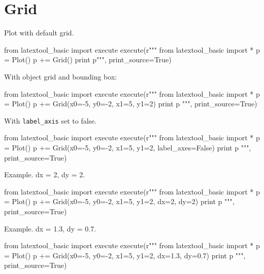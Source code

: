 \section{Grid}

Plot with default grid.
\begin{python}
from latextool_basic import execute
execute(r"""
from latextool_basic import *
p = Plot()
p += Grid()
print p""", print_source=True)
\end{python}


With object grid and bounding box:
\begin{python}
from latextool_basic import execute
execute(r"""
from latextool_basic import *
p = Plot()
p += Grid(x0=-5, y0=-2, x1=5, y1=2)
print p
""", print_source=True)
\end{python}


With \verb!label_axis! set to false.
\begin{python}
from latextool_basic import execute
execute(r"""
from latextool_basic import *
p = Plot()
p += Grid(x0=-5, y0=-2, x1=5, y1=2, label_axes=False)
print p
""", print_source=True)
\end{python}




Example. dx = 2, dy = 2.
\begin{python}
from latextool_basic import execute
execute(r"""
from latextool_basic import *
p = Plot()
p += Grid(x0=-5, y0=-2, x1=5, y1=2, dx=2, dy=2)
print p
""", print_source=True)
\end{python}




Example. dx = 1.3, dy = 0.7.
\begin{python}
from latextool_basic import execute
execute(r"""
from latextool_basic import *
p = Plot()
p += Grid(x0=-5, y0=-2, x1=5, y1=2, dx=1.3, dy=0.7)
print p
""", print_source=True)
\end{python}

